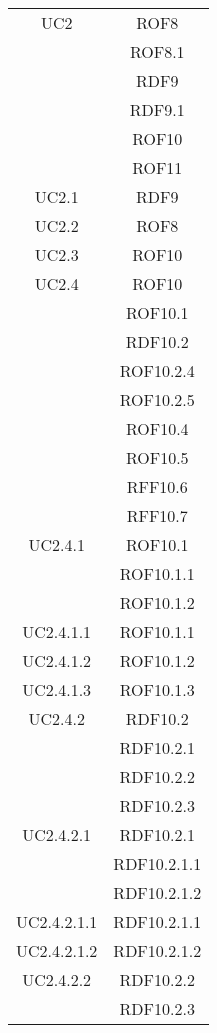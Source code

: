 \begin{longtable}{|c|c|}

\midrule
UC2
& ROF8\\
& ROF8.1\\
& RDF9\\
& RDF9.1\\
& ROF10\\
& ROF11\\

\midrule
UC2.1
& RDF9\\

\midrule
UC2.2
& ROF8\\

\midrule
UC2.3
& ROF10\\

\midrule
UC2.4
& ROF10\\
& ROF10.1\\
& RDF10.2\\
& ROF10.2.4\\
& ROF10.2.5\\
& ROF10.4\\
& ROF10.5\\
& RFF10.6\\
& RFF10.7\\

\midrule
UC2.4.1
& ROF10.1\\
& ROF10.1.1\\
& ROF10.1.2\\

\midrule
UC2.4.1.1
& ROF10.1.1\\

\midrule
UC2.4.1.2
& ROF10.1.2\\

\midrule
UC2.4.1.3
& ROF10.1.3\\

\midrule
UC2.4.2
& RDF10.2\\
& RDF10.2.1\\
& RDF10.2.2\\
& RDF10.2.3\\

\midrule
UC2.4.2.1
& RDF10.2.1\\
& RDF10.2.1.1\\
& RDF10.2.1.2\\

\midrule
UC2.4.2.1.1
& RDF10.2.1.1\\

\midrule
UC2.4.2.1.2
& RDF10.2.1.2\\

\midrule
UC2.4.2.2
& RDF10.2.2\\
& RDF10.2.3\\


\end{longtable}
